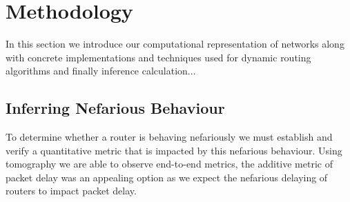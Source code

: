 \chapter{Methodology}
\label{cha:methodology}
In this section we introduce our computational representation of networks along with concrete implementations and techniques used for dynamic routing algorithms and finally inference calculation...


\section{Inferring Nefarious Behaviour}
\label{sec:Mnetworkprobing}
    To determine whether a router is behaving nefariously we must establish and verify a quantitative metric that is impacted by this nefarious behaviour. Using tomography we are able to observe end-to-end metrics, the additive metric of packet delay was an appealing option as we expect the nefarious delaying of routers to impact packet delay.
    
